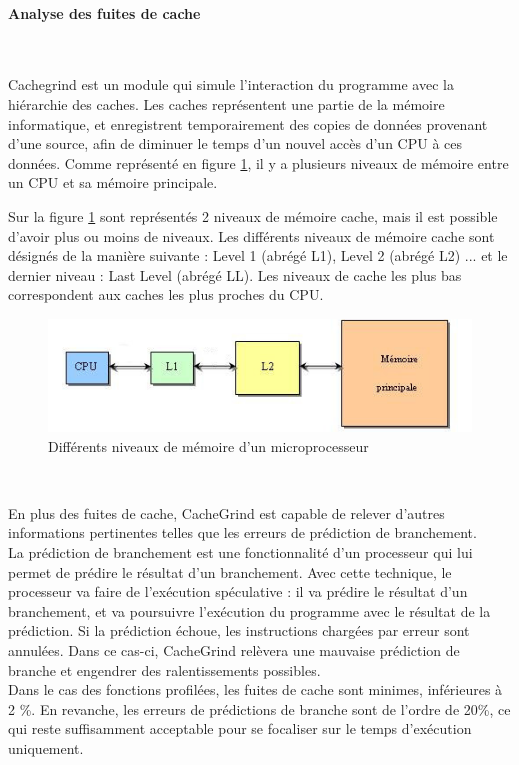 \documentclass[10pt]{report}
\begin{document}
\paragraph{Analyse des fuites de cache}~\par
Cachegrind est un module qui simule l'interaction du programme avec la hiérarchie des caches. Les caches représentent une partie de la mémoire informatique, et enregistrent temporairement des copies de données provenant d'une source, afin de diminuer le temps d'un nouvel accès d'un CPU à ces données. Comme représenté en figure \ref{Différents niveaux de mémoire d'un microprocesseur}, il y a plusieurs niveaux de mémoire entre un CPU et sa mémoire principale. 

Sur la figure \ref{Différents niveaux de mémoire d'un microprocesseur} sont représentés 2 niveaux de mémoire cache, mais il est possible d'avoir plus ou moins de niveaux.
Les différents niveaux de mémoire cache sont désignés de la manière suivante : Level 1 (abrégé L1), Level 2 (abrégé L2) ... et le dernier niveau : Last Level (abrégé LL). Les niveaux de cache les plus bas correspondent aux caches les plus proches du CPU. 
\begin{figure}[h!]
	\begin{center}
		\includegraphics[width=13cm]{Reports/figures/Mem_hierarchy.jpg}
	\end{center}	
	\caption{Différents niveaux de mémoire d'un microprocesseur}
	\label{Différents niveaux de mémoire d'un microprocesseur}
\end{figure}~\par 
En plus des fuites de cache, CacheGrind est capable de relever d'autres informations pertinentes telles que les erreurs de prédiction de branchement.\\
La prédiction de branchement est une fonctionnalité d'un processeur qui lui permet de prédire le résultat d'un branchement. Avec cette technique, le processeur va faire de l’exécution spéculative : il va prédire le résultat d'un branchement, et va poursuivre l’exécution du programme avec le résultat de la prédiction. Si la prédiction échoue, les instructions chargées par erreur sont annulées. Dans ce cas-ci, CacheGrind relèvera une mauvaise prédiction de branche et engendrer des ralentissements possibles.\\
Dans le cas des fonctions profilées, les fuites de cache sont minimes, inférieures à 2 \%. En revanche, les erreurs de prédictions de branche sont de l'ordre de 20\%, ce qui reste suffisamment acceptable pour se focaliser sur le temps d'exécution uniquement.  
\newpage
\end{document}
